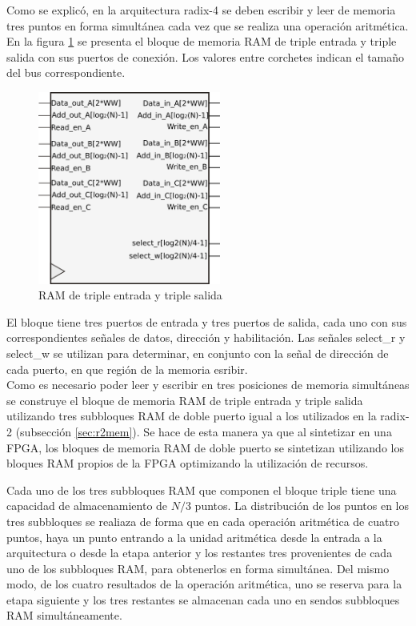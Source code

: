 Como se explicó, en la arquitectura radix-4 se deben escribir y leer de memoria tres puntos en forma
simultánea cada vez que se realiza una operación aritmética.
En la figura \ref{fig:tripleRam} se presenta el bloque de memoria RAM de triple entrada y triple
salida con sus puertos de conexión. Los valores entre corchetes indican el tamaño del bus
correspondiente.

\begin{figure}[htb!]
        \centering
        \includegraphics[width=6cm]{./figures/tripleRAM.png}
        \caption{RAM de triple entrada y triple salida}
        \label{fig:tripleRam}
\end{figure}

El bloque tiene tres puertos de entrada y tres puertos de
salida, cada uno con sus correspondientes señales de datos, dirección y habilitación. Las señales
select\_r y select\_w se utilizan para determinar, en conjunto con la señal de dirección de cada
puerto, en que región de la memoria esribir.\\

Como es necesario poder leer y escribir en tres posiciones de memoria simultáneas se construye el
bloque de memoria RAM de triple entrada y triple salida utilizando tres subbloques RAM de doble
puerto igual a los utilizados en la radix-2 (subsección \ref{sec:r2mem}). Se hace de esta manera ya que al
sintetizar en una FPGA, los bloques de memoria RAM de doble puerto se sintetizan utilizando los
bloques RAM propios de la FPGA optimizando la utilización de recursos.


Cada uno de los tres subbloques RAM que componen el bloque triple tiene una capacidad de
almacenamiento de $N/3$ puntos. La distribución de los puntos en los tres subbloques se realiaza de
forma que en cada operación aritmética de cuatro puntos, haya un punto entrando a la unidad
aritmética desde la entrada a la arquitectura o desde la etapa anterior y los restantes tres
provenientes de cada uno de los subbloques RAM, para obtenerlos en forma simultánea. Del mismo
modo, de los cuatro resultados de la operación aritmética, uno se reserva para la etapa siguiente y
los tres restantes se almacenan cada uno en sendos subbloques RAM simultáneamente.

